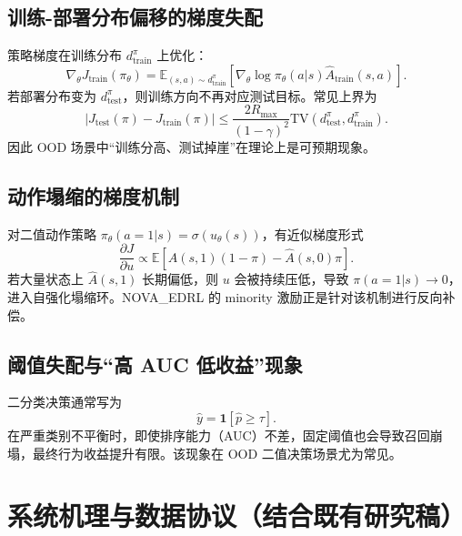 \documentclass[UTF8,11pt,a4paper]{ctexart}
\begin{document}
\subsection{训练-部署分布偏移的梯度失配}
策略梯度在训练分布 \(d_{\text{train}}^\pi\) 上优化：
\begin{equation}
\nabla_\theta J_{\text{train}}(\pi_\theta)=
\mathbb{E}_{(s,a)\sim d_{\text{train}}^\pi}
\left[\nabla_\theta\log\pi_\theta(a|s)\hat A_{\text{train}}(s,a)\right].
\end{equation}
若部署分布变为 \(d_{\text{test}}^\pi\)，则训练方向不再对应测试目标。常见上界为
\begin{equation}
|J_{\text{test}}(\pi)-J_{\text{train}}(\pi)|
\le
\frac{2R_{\max}}{(1-\gamma)^2}\mathrm{TV}(d_{\text{test}}^\pi,d_{\text{train}}^\pi).
\end{equation}
因此 OOD 场景中“训练分高、测试掉崖”在理论上是可预期现象。

\subsection{动作塌缩的梯度机制}
对二值动作策略 \(\pi_\theta(a=1|s)=\sigma(u_\theta(s))\)，有近似梯度形式
\begin{equation}
\frac{\partial J}{\partial u}
\propto
\mathbb{E}\left[\hat A(s,1)(1-\pi)-\hat A(s,0)\pi\right].
\end{equation}
若大量状态上 \(\hat A(s,1)\) 长期偏低，则 \(u\) 会被持续压低，导致 \(\pi(a=1|s)\to 0\)，进入自强化塌缩环。NOVA\_EDRL 的 minority 激励正是针对该机制进行反向补偿。

\subsection{阈值失配与“高 AUC 低收益”现象}
二分类决策通常写为
\begin{equation}
\hat y=\mathbf{1}[\hat p\ge \tau].
\end{equation}
在严重类别不平衡时，即使排序能力（AUC）不差，固定阈值也会导致召回崩塌，最终行为收益提升有限。该现象在 OOD 二值决策场景尤为常见。

\section{系统机理与数据协议（结合既有研究稿）}
\end{document}
